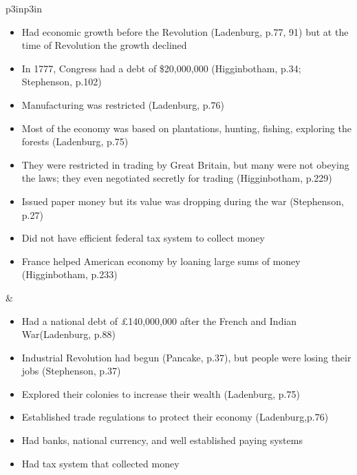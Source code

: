 \begin{singlespace}
\begin{mpxtabular}{p{3in}p{3in}}
\begin{itemize}[nolistsep,leftmargin=*]
	\end{itemize}\ML
	\ML
	\begin{itemize}[nolistsep,leftmargin=*]
	     \item Had economic growth before the Revolution (Ladenburg, p.77, 91) but at the time of Revolution the growth declined
	     \item In 1777, Congress had a debt of \$20,000,000 (Higginbotham, p.34; Stephenson, p.102)
	     \item Manufacturing was restricted (Ladenburg, p.76)
	     \item Most of the economy was based on plantations, hunting, fishing, exploring the forests (Ladenburg, p.75) 
	     \item They were restricted in trading by Great Britain, but many were not obeying the laws; they even negotiated secretly for trading (Higginbotham, p.229)
	     \item Issued paper money but its value  was dropping during the war (Stephenson, p.27)
	     \item Did not have efficient federal tax system to collect money 
	     \item France helped American economy by loaning large sums of money (Higginbotham, p.233)
	\end{itemize}
	&
	\begin{itemize}[nolistsep,leftmargin=*]
	    \item Had a national debt of £140,000,000 after the French and Indian War(Ladenburg, p.88) 
	    \item Industrial Revolution had begun (Pancake, p.37), but people were losing their jobs (Stephenson, p.37) 
	    \item Explored their colonies to increase their wealth (Ladenburg, p.75) 
	    \item Established trade regulations to protect their economy (Ladenburg,p.76) 
	    \item Had banks, national currency, and well established paying systems 
	    \item Had tax system that collected money 
	\end{itemize}\ML
      \end{mpxtabular}
\end{singlespace}
%
